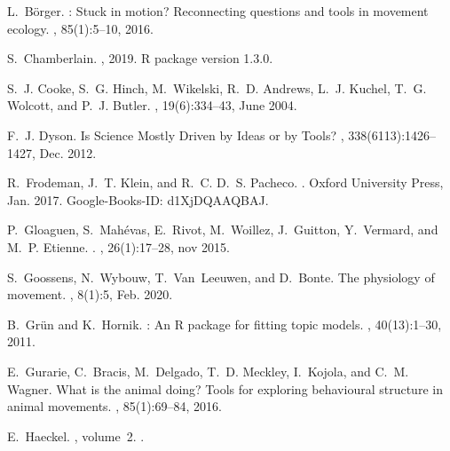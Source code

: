 \documentclass[a4paper,12pt]{article}
\begin{document}
\begin{thebibliography}{10}
	L.~Börger.
	: {Stuck} in motion? {Reconnecting} questions and tools in
	movement ecology.
	, 85(1):5--10, 2016.
	
	S.~Chamberlain.
	, 2019.
	\newblock R package version 1.3.0.
	
	S.~J. Cooke, S.~G. Hinch, M.~Wikelski, R.~D. Andrews, L.~J. Kuchel, T.~G.
	Wolcott, and P.~J. Butler.
	, 19(6):334--43, June 2004.
	
	F.~J. Dyson.
	\newblock Is {Science} {Mostly} {Driven} by {Ideas} or by {Tools}?
	, 338(6113):1426--1427, Dec. 2012.
	
	R.~Frodeman, J.~T. Klein, and R.~C. D.~S. Pacheco.
	.
	\newblock Oxford University Press, Jan. 2017.
	\newblock Google-Books-ID: d1XjDQAAQBAJ.
	
	P.~Gloaguen, S.~Mah{\'{e}}vas, E.~Rivot, M.~Woillez, J.~Guitton, Y.~Vermard,
	and M.~P. Etienne.
	.
	, 26(1):17--28, nov 2015.
	
	S.~Goossens, N.~Wybouw, T.~Van~Leeuwen, and D.~Bonte.
	\newblock The physiology of movement.
	, 8(1):5, Feb. 2020.
	
	B.~Gr\"un and K.~Hornik.
	: An {R} package for fitting topic models.
	, 40(13):1--30, 2011.
	
	E.~Gurarie, C.~Bracis, M.~Delgado, T.~D. Meckley, I.~Kojola, and C.~M. Wagner.
	\newblock What is the animal doing? {Tools} for exploring behavioural structure
	in animal movements.
	, 85(1):69--84, 2016.
	
	E.~Haeckel.
	, volume~2.
	.
	

\end{thebibliography}
\end{document}
